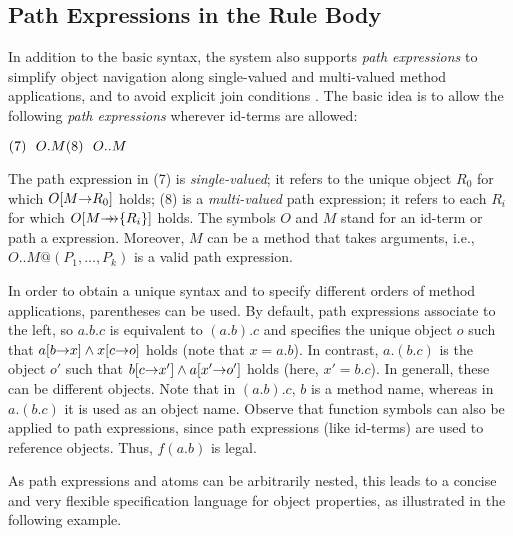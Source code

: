 \documentclass[11pt]{report}
\begin{document}
\subsection{Path Expressions in the Rule Body}

In addition to the basic \fl syntax, the \FLORA  system also supports
\emph{path expressions} to simplify object navigation along
single-valued and multi-valued method applications, and to avoid
explicit join conditions \cite{frohn-lausen-uphoff-VLDB-94}.  The
basic idea is to allow the following \emph{path expressions} wherever
id-terms are allowed:

  \medskip

\begin{math}
  \hfill (7)~~O.M \hfill (8)~~O..M \hfill
\end{math} \medskip

\noindent
The path expression in (7) is \emph{single-valued}; it refers to the unique
object $R_0$ for which $O[M{\rightarrow} R_0]$ holds; (8) is a \emph{multi-valued}
path expression; it refers to each $R_i$ for which $O[M{\rightarrow\!\!\!\!\rightarrow}\{R_i\}]$ holds.
The symbols $O$ and $M$ stand for an id-term or path a expression.
Moreover, $M$ can be a method that takes arguments, i.e.,
$O..M@(P_1,\dots,P_k)$ is a valid path expression.
  
In order to obtain a unique syntax and to specify different orders of
method applications, parentheses can be used. By default, path expressions
associate to the left, so $a.b.c$ is equivalent to $(a.b).c$ and specifies
the unique object $o$ such that $a[b{\rightarrow} x] \land x[c{\rightarrow} o]$ holds (note
that $x=a.b$). In contrast, $a.(b.c)$ is the object $o'$ such that $b[c{\rightarrow}
x'] \land a[x'{\rightarrow} o']$ holds (here, $x'=b.c$). In generall, these can be
different objects. Note that in $(a.b).c$, $b$ is a method name, whereas in
$a.(b.c)$ it is used as an object name.  Observe that function symbols can
also be applied to path expressions, since path expressions (like id-terms)
are used to reference objects. Thus, $f(a.b)$ is legal.
  
As path expressions and \fl atoms can be arbitrarily nested, this leads
to a concise and very flexible specification language for object
properties, as illustrated in the following example.
\end{document}
